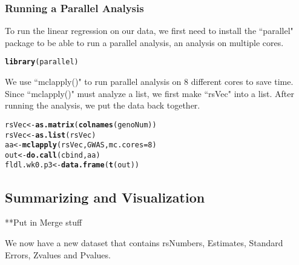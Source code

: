 \documentclass[11pt]{article}\usepackage[]{graphicx}\usepackage[]{color}
\makeatletter
\newcommand{\hlnum}[1]{\textcolor[rgb]{0.686,0.059,0.569}{#1}}%
\newcommand{\hlstd}[1]{\textcolor[rgb]{0.345,0.345,0.345}{#1}}%
\newcommand{\hlkwb}[1]{\textcolor[rgb]{0.69,0.353,0.396}{#1}}%
\newcommand{\hlkwc}[1]{\textcolor[rgb]{0.333,0.667,0.333}{#1}}%
\newcommand{\hlkwd}[1]{\textcolor[rgb]{0.737,0.353,0.396}{\textbf{#1}}}%
\newenvironment{kframe}{%
 \def\at@end@of@kframe{}%
 \ifinner\ifhmode%
  \def\at@end@of@kframe{\end{minipage}}%
  \begin{minipage}{\columnwidth}%
 \fi\fi%
 \def\FrameCommand##1{\hskip\@totalleftmargin \hskip-\fboxsep
 \colorbox{shadecolor}{##1}\hskip-\fboxsep
     \hskip-\linewidth \hskip-\@totalleftmargin \hskip\columnwidth}%
 \MakeFramed {\advance\hsize-\width
   \@totalleftmargin\z@ \linewidth\hsize
   \@setminipage}}%
 {\par\unskip\endMakeFramed%
 \at@end@of@kframe}
\newenvironment{knitrout}{}{} %
\makeatother
\begin{document}


\subsubsection{Running a Parallel Analysis}

To run the linear regression on our data, we first need to install the ``parallel" package to be able to run a parallel analysis, an analysis on multiple cores.

\begin{knitrout}
\color{fgcolor}\begin{kframe}
\begin{alltt}
\hlkwd{library}\hlstd{(parallel)}
\end{alltt}
\end{kframe}
\end{knitrout}


We use ``mclapply()" to run parallel analysis on 8 different cores to save time. Since ``mclapply()" must analyze a list, we first make ``rsVec" into a list. After running the analysis, we put the data back together.

\begin{knitrout}
\color{fgcolor}\begin{kframe}
\begin{alltt}
\hlstd{rsVec} \hlkwb{<-} \hlkwd{as.matrix}\hlstd{(}\hlkwd{colnames}\hlstd{(genoNum))}
\hlstd{rsVec} \hlkwb{<-} \hlkwd{as.list}\hlstd{(rsVec)}
\hlstd{aa} \hlkwb{<-} \hlkwd{mclapply}\hlstd{(rsVec, GWAS,} \hlkwc{mc.cores} \hlstd{=} \hlnum{8}\hlstd{)}
\hlstd{out} \hlkwb{<-} \hlkwd{do.call}\hlstd{(cbind, aa)}
\hlstd{fldl.wk0.p3} \hlkwb{<-} \hlkwd{data.frame}\hlstd{(}\hlkwd{t}\hlstd{(out))}
\end{alltt}
\end{kframe}
\end{knitrout}


\subsection{Summarizing and Visualization}

**Put in Merge stuff


We now have a new dataset that contains rsNumbers, Estimates, Standard Errors, Zvalues and Pvalues.
\end{document}
